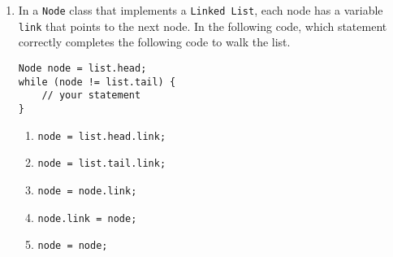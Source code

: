\documentclass[CS180-S16-FinalExam.tex]{subfiles}
\begin{document}
\begin{enumerate}


\clearpage
\item In a \texttt{Node} class that implements a \texttt{Linked List}, each node has a variable \texttt{link} that points to the next node. In the following code, which statement correctly completes the following code to walk the list.
\begin{lstlisting}
Node node = list.head;
while (node != list.tail) {
    // your statement
}
\end{lstlisting}

\begin{enumerate}
\item \texttt{node = list.head.link;}
\item \texttt{node = list.tail.link;}
\item \texttt{node = node.link;} \ifdraft \Ans \fi
\item \texttt{node.link = node;}
\item \texttt{node = node;}
\end{enumerate}


\end{enumerate}
\end{document}
